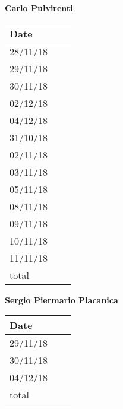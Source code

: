 \documentclass[../main.tex]{subfiles}
\begin{document}
\begin{center}
	{\bf Carlo Pulvirenti}
	\vspace{2mm}

		\begin{tabular}{p{1.3cm}|p{1.8cm}|p{6.7cm}}
			\hline
			\bf Date & \bf \makebox[1.8cm][c]{Hours} & \bf \makebox[6.7cm][c]{Description} \\
			\hline
			28/11/18 & \makebox[1.8cm][c]{1h} & \makebox[6.7cm][c]{Runtime View}\\
			29/11/18 & \makebox[1.8cm][c]{3h} & \makebox[6.7cm][c]{Runtime View}\\
			30/11/18 & \makebox[1.8cm][c]{2h} & \makebox[6.7cm][c]{Runtime View}\\
			02/12/18 & \makebox[1.8cm][c]{2h} & \makebox[6.7cm][c]{Runtime View}\\
			04/12/18 & \makebox[1.8cm][c]{2h} & \makebox[6.7cm][c]{Reviewing}\\
			31/10/18 & \makebox[1.8cm][c]{6h} & \makebox[6.7cm][c]{Use Cases, Scenarios}\\
			02/11/18 & \makebox[1.8cm][c]{4h} & \makebox[6.7cm][c]{Scenarios}\\
			03/11/18 & \makebox[1.8cm][c]{1h} & \makebox[6.7cm][c]{UML Class \& State Machine Diagrams}\\
			05/11/18 & \makebox[1.8cm][c]{4h} & \makebox[6.7cm][c]{Scenarios, Sequence Diagrams}\\
			08/11/18 & \makebox[1.8cm][c]{2h} & \makebox[6.7cm][c]{Sequence Diagramm, Alloy}\\
			09/11/18 & \makebox[1.8cm][c]{2h} & \makebox[6.7cm][c]{Sequence Diagram, Revisioning}\\
			10/11/18 & \makebox[1.8cm][c]{2h} & \makebox[6.7cm][c]{Revisioning}\\
			11/11/18 & \makebox[1.8cm][c]{4h} & \makebox[6.7cm][c]{Revisioning}\\
			total    & \makebox[1.8cm][c]{42h}
		\end{tabular}
\end{center}

\vspace{1cm}

\newpage

\begin{center}
	{\bf Sergio Piermario Placanica}
	\vspace{2mm}

		\begin{tabular}{p{1.3cm}|p{1.8cm}|p{6.7cm}}
			\hline
			\bf Date & \bf \makebox[1.8cm][c]{Hours} & \bf \makebox[6.7cm][c]{Description} \\
			\hline
			29/11/18 & \makebox[1.8cm][c]{2h} & \makebox[6.7cm][c]{Architechtural Design}\\
			30/11/18 & \makebox[1.8cm][c]{1h} & \makebox[6.7cm][c]{Architectural Design}\\
			04/12/18 & \makebox[1.8cm][c]{2h} & \makebox[6.7cm][c]{Reviewing}\\


			total    & \makebox[1.8cm][c]{5h}
		\end{tabular}
	\end{center}
\end{document}

